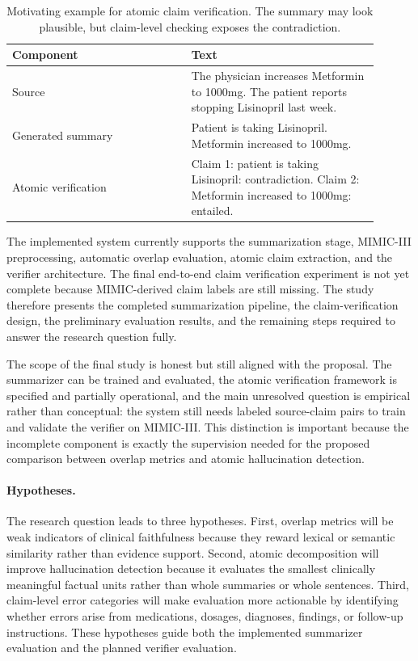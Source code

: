\documentclass[11pt]{article}
\begin{document}
\begin{table}[t]
\small
\centering
\begin{tabular}{@{}p{0.44\linewidth}p{0.46\linewidth}@{}}
\toprule
Component & Text \\ \midrule
Source & The physician increases Metformin to 1000mg. The patient reports stopping Lisinopril last week. \\
Generated summary & Patient is taking Lisinopril. Metformin increased to 1000mg. \\
Atomic verification & Claim 1: patient is taking Lisinopril: contradiction. Claim 2: Metformin increased to 1000mg: entailed. \\ \bottomrule
\end{tabular}
\caption{Motivating example for atomic claim verification. The summary may look plausible, but claim-level checking exposes the contradiction.}
\label{tab:motivation}
\end{table}

The implemented system currently supports the summarization stage, MIMIC-III preprocessing, automatic overlap evaluation, atomic claim extraction, and the verifier architecture. The final end-to-end claim verification experiment is not yet complete because MIMIC-derived claim labels are still missing. The study therefore presents the completed summarization pipeline, the claim-verification design, the preliminary evaluation results, and the remaining steps required to answer the research question fully.

The scope of the final study is honest but still aligned with the proposal. The summarizer can be trained and evaluated, the atomic verification framework is specified and partially operational, and the main unresolved question is empirical rather than conceptual: the system still needs labeled source-claim pairs to train and validate the verifier on MIMIC-III. This distinction is important because the incomplete component is exactly the supervision needed for the proposed comparison between overlap metrics and atomic hallucination detection.

\paragraph{Hypotheses.}
The research question leads to three hypotheses. First, overlap metrics will be weak indicators of clinical faithfulness because they reward lexical or semantic similarity rather than evidence support. Second, atomic decomposition will improve hallucination detection because it evaluates the smallest clinically meaningful factual units rather than whole summaries or whole sentences. Third, claim-level error categories will make evaluation more actionable by identifying whether errors arise from medications, dosages, diagnoses, findings, or follow-up instructions. These hypotheses guide both the implemented summarizer evaluation and the planned verifier evaluation.
\end{document}
